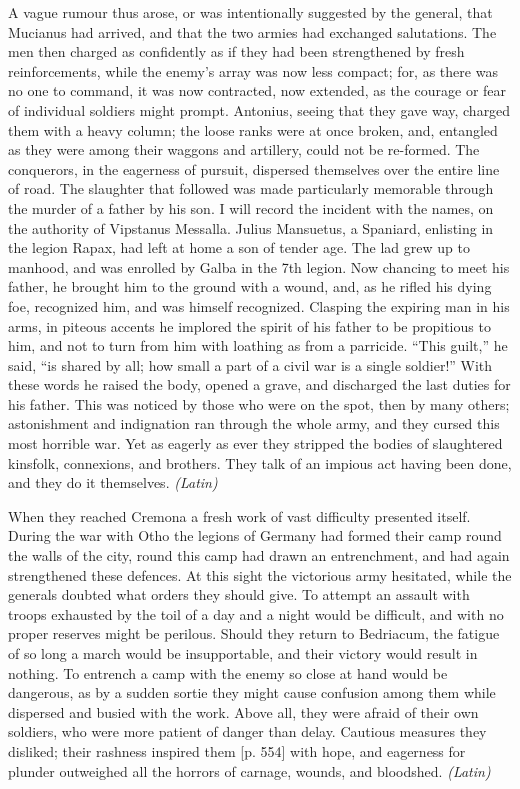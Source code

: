 
A vague rumour thus arose, or was intentionally suggested by the general, that Mucianus had arrived, and that the two armies had exchanged salutations. The men then charged as confidently as if they had been strengthened by fresh reinforcements, while the enemy's array was now less compact; for, as there was no one to command, it was now contracted, now extended, as the courage or fear of individual soldiers might prompt. Antonius, seeing that they gave way, charged them with a heavy column; the loose ranks were at once broken, and, entangled as they were among their waggons and artillery, could not be re-formed. The conquerors, in the eagerness of pursuit, dispersed themselves over the entire line of road. The slaughter that followed was made particularly memorable through the murder of a father by his son. I will record the incident with the names, on the authority of Vipstanus Messalla. Julius Mansuetus, a Spaniard, enlisting in the legion Rapax, had left at home a son of tender age. The lad grew up to manhood, and was enrolled by Galba in the 7th legion. Now chancing to meet his father, he brought him to the ground with a wound, and, as he rifled his dying foe, recognized him, and was himself recognized. Clasping the expiring man in his arms, in piteous accents he implored the spirit of his father to be propitious to him, and not to turn from him with loathing as from a parricide. ``This guilt,'' he said, ``is shared by all; how small a part of a civil war is a single soldier!'' With these words he raised the body, opened a grave, and discharged the last duties for his father. This was noticed by those who were on the spot, then by many others; astonishment and indignation ran through the whole army, and they cursed this most horrible war. Yet as eagerly as ever they stripped the bodies of slaughtered kinsfolk, connexions, and brothers. They talk of an impious act having been done, and they do it themselves. \emph{(Latin)}


When they reached Cremona a fresh work of vast difficulty presented itself. During the war with Otho the legions of Germany had formed their camp round the walls of the city, round this camp had drawn an entrenchment, and had again strengthened these defences. At this sight the victorious army hesitated, while the generals doubted what orders they should give. To attempt an assault with troops exhausted by the toil of a day and a night would be difficult, and with no proper reserves might be perilous. Should they return to Bedriacum, the fatigue of so long a march would be insupportable, and their victory would result in nothing. To entrench a camp with the enemy so close at hand would be dangerous, as by a sudden sortie they might cause confusion among them while dispersed and busied with the work. Above all, they were afraid of their own soldiers, who were more patient of danger than delay. Cautious measures they disliked; their rashness inspired them [p. 554] with hope, and eagerness for plunder outweighed all the horrors of carnage, wounds, and bloodshed. \emph{(Latin)}

